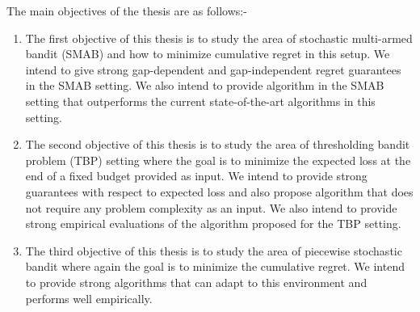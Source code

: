 The main objectives of the thesis are as follows:-
\begin{enumerate}
\item The first objective of this thesis is to study the area of stochastic multi-armed bandit (SMAB) and how to minimize cumulative regret in this setup. We intend to give strong gap-dependent and gap-independent regret guarantees in the SMAB setting. We also intend to provide algorithm in the SMAB setting that outperforms the current state-of-the-art algorithms in this setting.

\item The second objective of this thesis is to study the area of thresholding bandit problem (TBP) setting where the goal is to minimize the expected loss at the end of a fixed budget provided as input. We intend to provide strong guarantees with respect to expected loss and also propose algorithm that does not require any problem complexity as an input. We also intend to provide strong empirical evaluations of the algorithm proposed for the TBP setting.

\item The third objective of this thesis is to study the area of piecewise stochastic bandit where again the goal is to minimize the cumulative regret. We intend to provide strong algorithms that can adapt to this environment and performs well empirically.  
\end{enumerate}